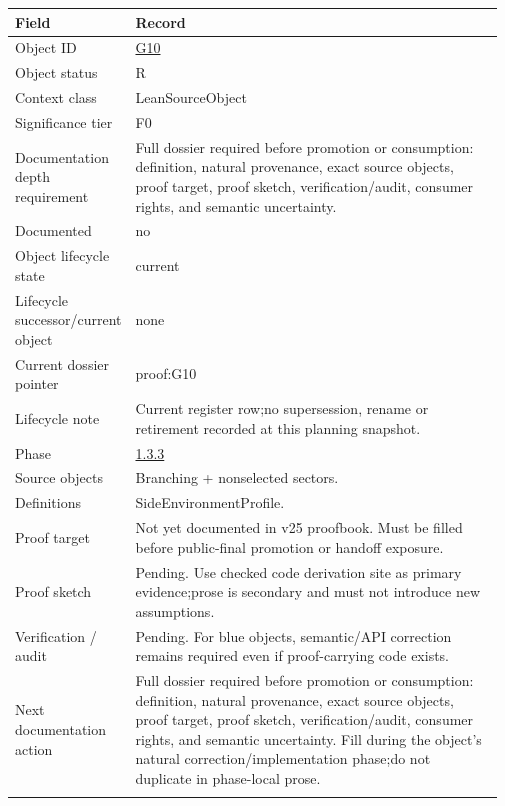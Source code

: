 \begin{longtable}{L{0.16\linewidth} L{0.81\linewidth}}
\hline
\textbf{Field} & \textbf{Record}\\
\hline
Object ID & \hyperlink{object-row-G10}{G10}\\
\hline\addlinespace[0.20em]
Object status & R\\
\hline\addlinespace[0.20em]
Context class & LeanSourceObject\\
\hline\addlinespace[0.20em]
Significance tier & F0\\
\hline\addlinespace[0.20em]
Documentation depth requirement & Full dossier required before promotion or consumption: definition, natural provenance, exact source objects, proof target, proof sketch, verification/\allowbreak{}audit, consumer rights, and semantic uncertainty.\\
\hline\addlinespace[0.20em]
Documented & no\\
\hline\addlinespace[0.20em]
Object lifecycle state & current\\
\hline\addlinespace[0.20em]
Lifecycle successor/\allowbreak{}current object & none\\
\hline\addlinespace[0.20em]
Current dossier pointer & proof:G10\\
\hline\addlinespace[0.20em]
Lifecycle note & Current register row;\newline no supersession, rename or retirement recorded at this planning snapshot.\\
\hline\addlinespace[0.20em]
Phase & \hyperlink{phase-row-1-3-3}{1.3.3}\\
\hline\addlinespace[0.20em]
Source objects & Branching + nonselected sectors.\\
\hline\addlinespace[0.20em]
Definitions & SideEnvironmentProfile.\\
\hline\addlinespace[0.20em]
Proof target & Not yet documented in v25 proofbook. Must be filled before public-final promotion or handoff exposure.\\
\hline\addlinespace[0.20em]
Proof sketch & Pending. Use checked code derivation site as primary evidence;\newline prose is secondary and must not introduce new assumptions.\\
\hline\addlinespace[0.20em]
Verification /\allowbreak{} audit & Pending. For blue objects, semantic/\allowbreak{}API correction remains required even if proof-carrying code exists.\\
\hline\addlinespace[0.20em]
Next documentation action & Full dossier required before promotion or consumption: definition, natural provenance, exact source objects, proof target, proof sketch, verification/\allowbreak{}audit, consumer rights, and semantic uncertainty. Fill during the object's natural correction/\allowbreak{}implementation phase;\newline do not duplicate in phase-local prose.\\
\hline\addlinespace[0.20em]
\end{longtable}
